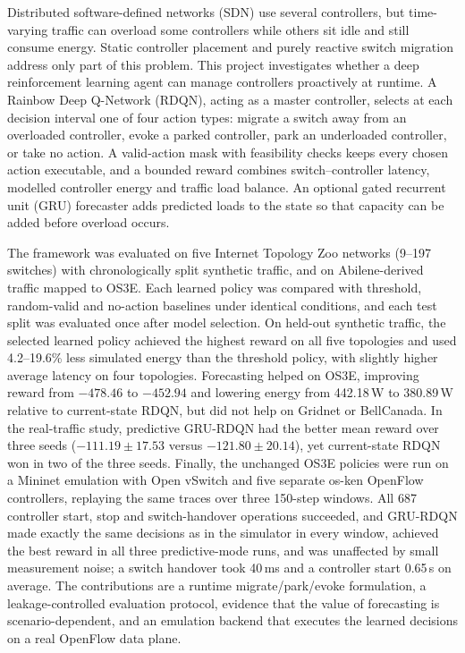 Distributed software-defined networks (SDN) use several controllers, but time-varying traffic can overload some controllers while others sit idle and still consume energy. Static controller placement and purely reactive switch migration address only part of this problem. This project investigates whether a deep reinforcement learning agent can manage controllers proactively at runtime. A Rainbow Deep Q-Network (RDQN), acting as a master controller, selects at each decision interval one of four action types: migrate a switch away from an overloaded controller, evoke a parked controller, park an underloaded controller, or take no action. A valid-action mask with feasibility checks keeps every chosen action executable, and a bounded reward combines switch--controller latency, modelled controller energy and traffic load balance. An optional gated recurrent unit (GRU) forecaster adds predicted loads to the state so that capacity can be added before overload occurs.

The framework was evaluated on five Internet Topology Zoo networks (9--197 switches) with chronologically split synthetic traffic, and on Abilene-derived traffic mapped to OS3E. Each learned policy was compared with threshold, random-valid and no-action baselines under identical conditions, and each test split was evaluated once after model selection. On held-out synthetic traffic, the selected learned policy achieved the highest reward on all five topologies and used 4.2--19.6\% less simulated energy than the threshold policy, with slightly higher average latency on four topologies. Forecasting helped on OS3E, improving reward from $-478.46$ to $-452.94$ and lowering energy from 442.18\,W to 380.89\,W relative to current-state RDQN, but did not help on Gridnet or BellCanada. In the real-traffic study, predictive GRU-RDQN had the better mean reward over three seeds ($-111.19\pm17.53$ versus $-121.80\pm20.14$), yet current-state RDQN won in two of the three seeds. Finally, the unchanged OS3E policies were run on a Mininet emulation with Open vSwitch and five separate os-ken OpenFlow controllers, replaying the same traces over three 150-step windows. All 687 controller start, stop and switch-handover operations succeeded, and GRU-RDQN made exactly the same decisions as in the simulator in every window, achieved the best reward in all three predictive-mode runs, and was unaffected by small measurement noise; a switch handover took 40\,ms and a controller start 0.65\,s on average. The contributions are a runtime migrate/park/evoke formulation, a leakage-controlled evaluation protocol, evidence that the value of forecasting is scenario-dependent, and an emulation backend that executes the learned decisions on a real OpenFlow data plane.
